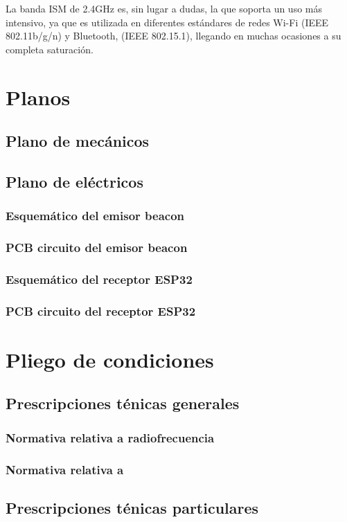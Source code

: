 \documentclass[a4paper ,12pt, onecolumn]{article}
\begin{document}
            La banda ISM de 2.4GHz es, sin lugar a dudas, la que soporta un uso más intensivo, ya que es utilizada en 
            diferentes estándares de redes Wi-Fi (IEEE 802.11b/g/n) y Bluetooth, (IEEE 802.15.1), llegando en muchas 
            ocasiones a su completa saturación.
\section{Planos}
    \subsection{Plano de mecánicos}
    \subsection{Plano de eléctricos}
        \subsubsection{Esquemático del emisor beacon}
        \subsubsection{PCB circuito del emisor beacon}
        \subsubsection{Esquemático del receptor ESP32}
        \subsubsection{PCB circuito del receptor ESP32}
\section{Pliego de condiciones}
    \subsection{Prescripciones ténicas generales}
        \subsubsection{Normativa relativa a radiofrecuencia}
        \subsubsection{Normativa relativa a }
    \subsection{Prescripciones ténicas particulares}
\end{document}
